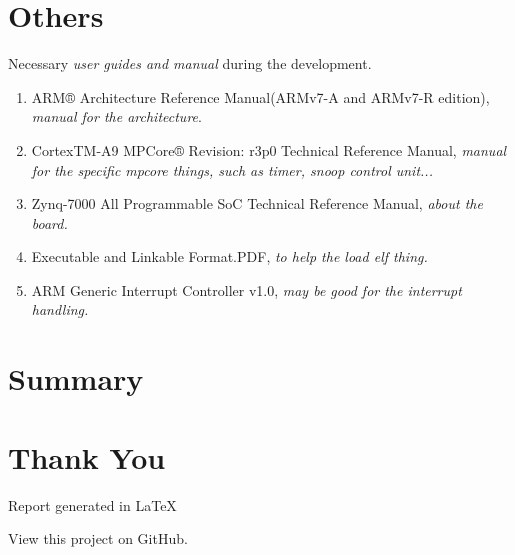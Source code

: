 \documentclass{article}
\begin{document}
\section{Others}

Necessary \emph{user guides and manual} during the development.

\begin{enumerate}
	\item	ARM® Architecture Reference Manual(ARMv7-A and ARMv7-R edition), \emph{manual for the architecture}.
	\item CortexTM-A9 MPCore® Revision: r3p0 Technical Reference Manual, \emph{manual for the specific mpcore things, such as timer, snoop control unit...}
	\item	Zynq-7000 All Programmable SoC Technical Reference Manual, \emph{about the board.}
	\item	Executable and Linkable Format.PDF, \emph{to help the load elf thing.}
	\item ARM Generic Interrupt Controller v1.0, \emph{may be good for the interrupt handling.}
\end{enumerate}

\section{Summary}

\section{Thank You}

\indent \indent Report generated in \LaTeX

View this project on GitHub.

\begin{thebibliography}{99}
\end{thebibliography}
\end{document}
